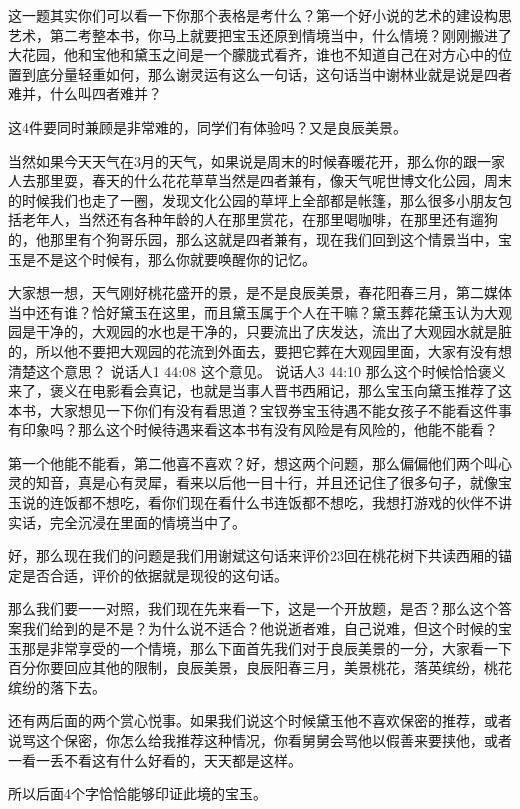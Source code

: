 \documentclass{ctexart}
\renewcommand{\\}{\par}
\begin{document}
这一题其实你们可以看一下你那个表格是考什么？第一个好小说的艺术的建设构思艺术，第二考整本书，你马上就要把宝玉还原到情境当中，什么情境？刚刚搬进了大花园，他和宝他和黛玉之间是一个朦胧式看齐，谁也不知道自己在对方心中的位置到底分量轻重如何，那么谢灵运有这么一句话，这句话当中谢林业就是说是四者难并，什么叫四者难并？

这4件要同时兼顾是非常难的，同学们有体验吗？又是良辰美景。

当然如果今天天气在3月的天气，如果说是周末的时候春暖花开，那么你的跟一家人去那里耍，春天的什么花花草草当然是四者兼有，像天气呢世博文化公园，周末的时候我们也走了一圈，发现文化公园的草坪上全部都是帐篷，那么很多小朋友包括老年人，当然还有各种年龄的人在那里赏花，在那里喝咖啡，在那里还有遛狗的，他那里有个狗哥乐园，那么这就是四者兼有，现在我们回到这个情景当中，宝玉是不是这个时候有，那么你就要唤醒你的记忆。

大家想一想，天气刚好桃花盛开的景，是不是良辰美景，春花阳春三月，第二媒体当中还有谁？恰好黛玉在这里，而且黛玉属于个人在干嘛？黛玉葬花黛玉认为大观园是干净的，大观园的水也是干净的，只要流出了庆发达，流出了大观园水就是脏的，所以他不要把大观园的花流到外面去，要把它葬在大观园里面，大家有没有想清楚这个意思？
说话人1 44:08
这个意见。
说话人3 44:10
那么这个时候恰恰褒义来了，褒义在电影看会真记，也就是当事人晋书西厢记，那么宝玉向黛玉推荐了这本书，大家想见一下你们有没有看思道？宝钗券宝玉待遇不能女孩子不能看这件事有印象吗？那么这个时候待遇来看这本书有没有风险是有风险的，他能不能看？

第一个他能不能看，第二他喜不喜欢？好，想这两个问题，那么偏偏他们两个叫心灵的知音，真是心有灵犀，看来以后他一目十行，并且还记住了很多句子，就像宝玉说的连饭都不想吃，看你们现在看什么书连饭都不想吃，我想打游戏的伙伴不讲实话，完全沉浸在里面的情境当中了。

好，那么现在我们的问题是我们用谢斌这句话来评价23回在桃花树下共读西厢的锚定是否合适，评价的依据就是现役的这句话。

那么我们要一一对照，我们现在先来看一下，这是一个开放题，是否？那么这个答案我们给到的是不是？为什么说不适合？他说逝者难，自己说难，但这个时候的宝玉那是非常享受的一个情境，那么下面首先我们对于良辰美景的一分，大家看一下百分你要回应其他的限制，良辰美景，良辰阳春三月，美景桃花，落英缤纷，桃花缤纷的落下去。

还有两后面的两个赏心悦事。如果我们说这个时候黛玉他不喜欢保密的推荐，或者说骂这个保密，你怎么给我推荐这种情况，你看舅舅会骂他以假善来要挟他，或者一看一丢不看这有什么好看的，天天都是这样。

所以后面4个字恰恰能够印证此境的宝玉。
\end{document}
